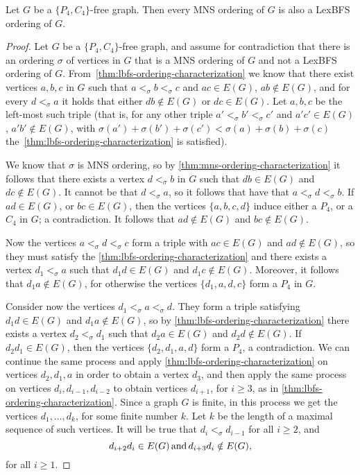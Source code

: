 \documentclass{svproc}
\begin{document}
\begin{lemma}\label{lem:p4c4-lexbfs}
Let $G$ be a $\{P_4,C_4\}$-free graph.
Then every MNS ordering of $G$ is also a LexBFS ordering of $G$. 
\end{lemma}
\begin{proof}

Let $G$ be a $\{P_4,C_4\}$-free graph, and assume for contradiction that there is an ordering $\sigma$ of vertices in $G$ that is a MNS ordering of $G$ and not a LexBFS ordering of $G$. From~\cref{thm:lbfs-ordering-characterization} we know that there exist vertices $a,b,c$ in $G$ such that $a<_\sigma
b<_\sigma c$ and $ac\in E(G)$, $ab\notin E(G)$, and for every $d<_\sigma a$ it holds that either $db\notin E(G)$ or $dc\in E(G)$. Let $a,b,c$ be the left-most such triple (that is, for any other triple $a'<_\sigma
b'<_\sigma c'$ and $a'c'\in E(G)$, $a'b'\notin E(G)$, with $\sigma(a')+\sigma(b')+\sigma(c')< \sigma(a)+\sigma(b)+\sigma(c)$ the~\cref{thm:lbfs-ordering-characterization} is satisfied). 

We know that $\sigma$ is MNS ordering, so by \cref{thm:mns-ordering-characterization} it follows that there exists a vertex $ d<_\sigma b$ in $G$ such that $db\in E(G)$ and $dc\notin E(G)$. It cannot be that $d<_\sigma a$, so it follows that have that $a<_\sigma d<_\sigma b$. If $ad\in E(G)$, or $bc\in E(G)$, then the vertices $\{a,b,c,d\}$ induce either a $P_4$, or a $C_4$ in $G$; a contradiction. It follows that $ad\notin E(G)$ and $bc\notin E(G)$. 

Now the vertices $a<_\sigma d<_\sigma c$ form a triple with $ac\in E(G)$ and $ad\notin E(G)$, so they must satisfy the \cref{thm:lbfs-ordering-characterization} and there exists a vertex $d_1<_\sigma a$ such that $d_1d\in E(G)$ and $d_1c\notin E(G)$. Moreover, it follows that $d_1a\notin E(G)$, for otherwise the vertices $\{d_1,a,d,c\}$ form a $P_4$ in $G$. 

Consider now the vertices $d_1<_\sigma a<_\sigma d$. They form a triple satisfying $d_1d\in E(G)$ and $d_1a\notin E(G)$, so by \cref{thm:lbfs-ordering-characterization} there exists a vertex $d_2<_\sigma d_1$ such that $d_2a\in E(G)$ and $d_2d\notin E(G)$. If $d_2d_1\in E(G)$, then the vertices $\{d_2,d_1,a,d\}$ form a $P_4$, a contradiction. 
We can continue the same process and apply \cref{thm:lbfs-ordering-characterization} on vertices $d_2,d_1,a$ in order to obtain a vertex $d_3$, and then apply the same process on vertices $d_i, d_{i-1}, d_{i-2}$ to obtain vertices $d_{i+1}$, for $i\ge 3$, as in \cref{thm:lbfs-ordering-characterization}.
Since a graph $G$ is finite, in this process we get the vertices $d_1,\dots, d_k$, for some finite number $k$. Let $k$ be the length of a maximal sequence of such vertices. It will be true that $d_i<_\sigma d_{i-1}$ for all $i\ge 2$, and 
\begin{equation}
\label{eqn:edges}
d_{i+2}d_i\in E(G)\, {\rm and }\, d_{i+3}d_i\notin E(G),
\end{equation} for all $i\ge 1$. 



\end{proof}
\end{document}
